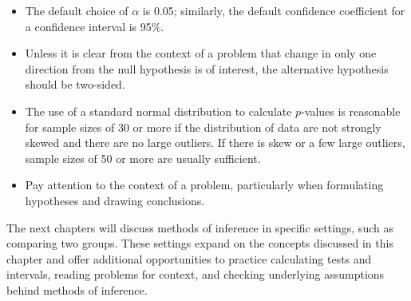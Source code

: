 \begin{spacing}{1.5}
\begin{itemize}
	\item The default choice of $\alpha$ is 0.05; similarly, the default confidence coefficient for a confidence interval is 95\%. 
	
	\item Unless it is clear from the context of a problem that change in only one direction from the null hypothesis is of interest, the alternative hypothesis should be two-sided.
	
	\item The use of a standard normal distribution to calculate $p$-values is reasonable for sample sizes of 30 or more if the distribution of data are not strongly skewed and there are no large outliers. If there is skew or a few large outliers, sample sizes of 50 or more are usually sufficient.
	
	\item Pay attention to the context of a problem, particularly when formulating hypotheses and drawing conclusions.
\end{itemize}

The next chapters will discuss methods of inference in specific settings, such as comparing two groups. These settings expand on the concepts discussed in this chapter and offer additional opportunities to practice calculating tests and intervals, reading problems for context, and checking underlying assumptions behind methods of inference.

\end{spacing}
